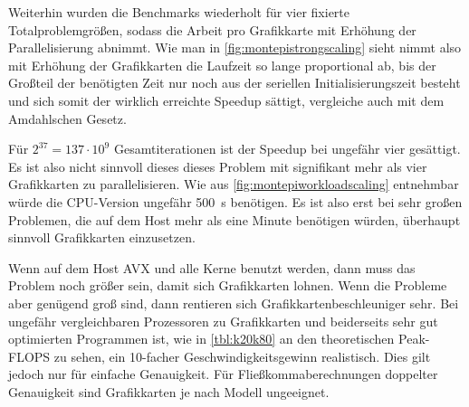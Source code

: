 Weiterhin wurden die Benchmarks wiederholt für vier fixierte Totalproblemgrößen, sodass die Arbeit pro Grafikkarte mit Erhöhung der Parallelisierung abnimmt.
Wie man in \autoref{fig:montepistrongscaling} sieht nimmt also mit Erhöhung der Grafikkarten die Laufzeit so lange proportional ab, bis der Großteil der benötigten Zeit nur noch aus der seriellen Initialisierungszeit besteht und sich somit der wirklich erreichte Speedup sättigt, vergleiche auch mit dem Amdahlschen Gesetz.

Für $2^37=137\cdot 10^9$ Gesamtiterationen ist der Speedup bei ungefähr vier gesättigt.
Es ist also nicht sinnvoll dieses dieses Problem mit signifikant mehr als vier Grafikkarten zu parallelisieren.
Wie aus \autoref{fig:montepiworkloadscaling} entnehmbar würde die CPU-Version ungefähr \SI{500}{\second} benötigen.
Es ist also erst bei sehr großen Problemen, die auf dem Host mehr als eine Minute benötigen würden, überhaupt sinnvoll Grafikkarten einzusetzen.

Wenn auf dem Host AVX und alle Kerne benutzt werden, dann muss das Problem noch größer sein, damit sich Grafikkarten lohnen.
Wenn die Probleme aber genügend groß sind, dann rentieren sich Grafikkartenbeschleuniger sehr.
Bei ungefähr vergleichbaren Prozessoren zu Grafikkarten und beiderseits sehr gut optimierten Programmen ist, wie in \autoref{tbl:k20k80} an den theoretischen Peak-FLOPS zu sehen, ein 10-facher Geschwindigkeitsgewinn realistisch.
Dies gilt jedoch nur für einfache Genauigkeit.
Für Fließkommaberechnungen doppelter Genauigkeit sind Grafikkarten je nach Modell ungeeignet.

